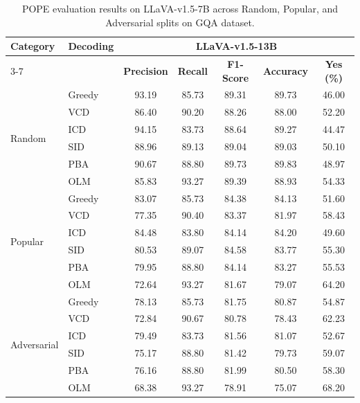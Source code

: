 \documentclass[11pt]{article}
\begin{document}
\setcounter{table}{8}

\begin{table}[ht]
\centering
\caption{POPE evaluation results on LLaVA-v1.5-7B across Random, Popular, and Adversarial splits on GQA dataset.}
\label{tab:pope_results_13b}

\setlength{\tabcolsep}{6pt}
\renewcommand{\arraystretch}{1.1}

\begin{tabular}{l|l|ccccc}
\toprule
\multirow{2}{*}{\textbf{Category}} &
\multirow{2}{*}{\textbf{Decoding}}
& \multicolumn{5}{c}{\textbf{LLaVA-v1.5-13B}} \\
\cmidrule(lr){3-7}
&
& \textbf{Precision}
& \textbf{Recall}
& \textbf{F1-Score}
& \textbf{Accuracy}
& \textbf{Yes (\%)} \\
\midrule

\multirow{6}{*}{Random}
& Greedy & 93.19 & 85.73 & 89.31 & 89.73 & 46.00 \\
& VCD    & 86.40 & 90.20 & 88.26 & 88.00 & 52.20 \\
& ICD    & 94.15 & 83.73 & 88.64 & 89.27 & 44.47 \\
& SID    & 88.96 & 89.13 & 89.04 & 89.03 & 50.10 \\
& PBA    & 90.67 & 88.80 & 89.73 & 89.83 & 48.97 \\
& OLM    & 85.83 & 93.27 & 89.39 & 88.93 & 54.33 \\
\midrule

\multirow{6}{*}{Popular}
& Greedy & 83.07 & 85.73 & 84.38 & 84.13 & 51.60 \\
& VCD    & 77.35 & 90.40 & 83.37 & 81.97 & 58.43 \\
& ICD    & 84.48 & 83.80 & 84.14 & 84.20 & 49.60 \\
& SID    & 80.53 & 89.07 & 84.58 & 83.77 & 55.30 \\
& PBA    & 79.95 & 88.80 & 84.14 & 83.27 & 55.53 \\
& OLM    & 72.64 & 93.27 & 81.67 & 79.07 & 64.20 \\
\midrule

\multirow{6}{*}{Adversarial}
& Greedy & 78.13 & 85.73 & 81.75 & 80.87 & 54.87 \\
& VCD    & 72.84 & 90.67 & 80.78 & 78.43 & 62.23 \\
& ICD    & 79.49 & 83.73 & 81.56 & 81.07 & 52.67 \\
& SID    & 75.17 & 88.80 & 81.42 & 79.73 & 59.07 \\
& PBA    & 76.16 & 88.80 & 81.99 & 80.50 & 58.30 \\
& OLM    & 68.38 & 93.27 & 78.91 & 75.07 & 68.20 \\
\bottomrule

\end{tabular}

\end{table}
\end{document}
